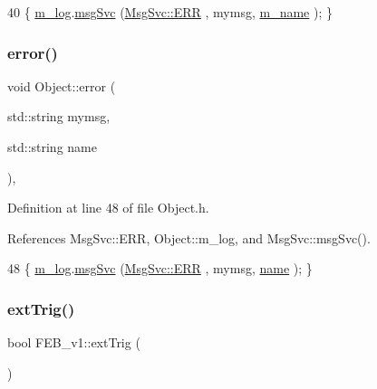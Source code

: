 \begin{DoxyCode}
40 \{ \hyperlink{classObject_a0d269813dd7ac1f24bc143031e2963f2}{m\_log}.\hyperlink{classMsgSvc_ad25f18047920cc59a314e5098259711c}{msgSvc} (\hyperlink{classMsgSvc_ae671eb7301996cd049d2da8a65925926a35a9d7166e9896af4ec8fb33bf5f1772}{MsgSvc::ERR}     , mymsg, \hyperlink{classObject_a8b83c95c705d2c3ba0d081fe1710f48d}{m\_name} ); \}
\end{DoxyCode}
\mbox{\label{classObject_ad7f6c457733082efa2f9ff5f5c8e119a}} 
\subsubsection{\texorpdfstring{error()}{error()}\hspace{0.1cm}{\footnotesize\ttfamily [2/2]}}
{\footnotesize\ttfamily void Object\+::error (\begin{DoxyParamCaption}\item[{std\+::string}]{mymsg,  }\item[{std\+::string}]{name }\end{DoxyParamCaption})\hspace{0.3cm}{\ttfamily [inline]}, {\ttfamily [inherited]}}



Definition at line 48 of file Object.\+h.



References Msg\+Svc\+::\+E\+RR, Object\+::m\+\_\+log, and Msg\+Svc\+::msg\+Svc().


\begin{DoxyCode}
48 \{ \hyperlink{classObject_a0d269813dd7ac1f24bc143031e2963f2}{m\_log}.\hyperlink{classMsgSvc_ad25f18047920cc59a314e5098259711c}{msgSvc} (\hyperlink{classMsgSvc_ae671eb7301996cd049d2da8a65925926a35a9d7166e9896af4ec8fb33bf5f1772}{MsgSvc::ERR}     , mymsg, \hyperlink{classObject_a300f4c05dd468c7bb8b3c968868443c1}{name} ); \}
\end{DoxyCode}
\mbox{\label{classFEB__v1_a481e089490ae958c7606f11d27c9db9a}} 
\subsubsection{\texorpdfstring{ext\+Trig()}{extTrig()}}
{\footnotesize\ttfamily bool F\+E\+B\+\_\+v1\+::ext\+Trig (\begin{DoxyParamCaption}{ }\end{DoxyParamCaption})\hspace{0.3cm}{\ttfamily [inline]}}



